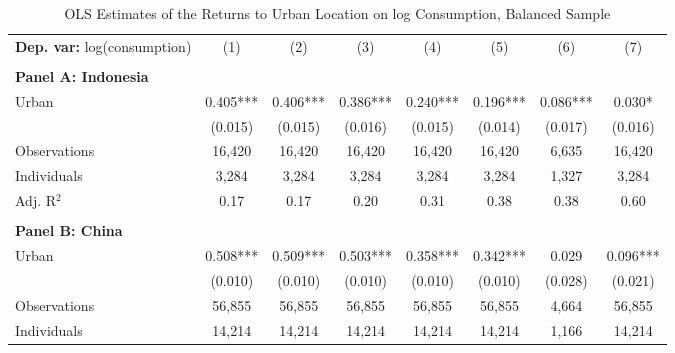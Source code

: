 \begin{table}[htbp] \centering \begin{threeparttable}
 \caption{OLS Estimates of the Returns to Urban Location on log Consumption, Balanced Sample} 
 \label{tab:OLS_cons_urb_bal} 
\begin{tabular}{l ccccccc} \toprule  \textbf{Dep. var:}  log(consumption) 
                    &\multicolumn{1}{c}{(1)}   &\multicolumn{1}{c}{(2)}   &\multicolumn{1}{c}{(3)}   &\multicolumn{1}{c}{(4)}   &\multicolumn{1}{c}{(5)}   &\multicolumn{1}{c}{(6)}   &\multicolumn{1}{c}{(7)}   \\
                    &               &               &               &               &               &               &               \\
\textbf{Panel A: Indonesia} \\
Urban               &       0.405***&       0.406***&       0.386***&       0.240***&       0.196***&       0.086***&       0.030*  \\
                    &     (0.015)   &     (0.015)   &     (0.016)   &     (0.015)   &     (0.014)   &     (0.017)   &     (0.016)   \\
\addlinespace
Observations        &      16,420   &      16,420   &      16,420   &      16,420   &      16,420   &       6,635   &      16,420   \\
Individuals         &       3,284   &       3,284   &       3,284   &       3,284   &       3,284   &       1,327   &       3,284   \\
Adj. R$^{2}$        &        0.17   &        0.17   &        0.20   &        0.31   &        0.38   &        0.38   &        0.60   \\
\cmidrule{2 -8}
                    &               &               &               &               &               &               &               \\
\textbf{Panel B: China} \\
Urban               &       0.508***&       0.509***&       0.503***&       0.358***&       0.342***&       0.029   &       0.096***\\
                    &     (0.010)   &     (0.010)   &     (0.010)   &     (0.010)   &     (0.010)   &     (0.028)   &     (0.021)   \\
\addlinespace
Observations        &      56,855   &      56,855   &      56,855   &      56,855   &      56,855   &       4,664   &      56,855   \\
Individuals         &      14,214   &      14,214   &      14,214   &      14,214   &      14,214   &       1,166   &      14,214   \\

\end{tabular}
\end{threeparttable}
\end{table}
